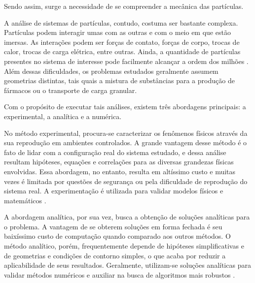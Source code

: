 

Sendo assim, surge a necessidade de se compreender a mecânica das partículas.

A análise de sistemas de partículas, contudo, costuma ser bastante complexa. Partículas podem interagir umas com as outras e com o meio em que estão imersas. As interações podem ser forças de contato, forças de corpo, trocas de calor, trocas de carga elétrica, entre outras. Ainda, a quantidade de partículas presentes no sistema de interesse pode facilmente alcançar a ordem dos milhões \cite{bib:computational_granular_dynamics}. Além dessas dificuldades, os problemas estudados geralmente assumem geometrias distintas, tais quais a mistura de substâncias para a produção de fármacos ou o transporte de carga granular.

Com o propósito de executar tais análises, existem três abordagens principais: a experimental, a analítica e a numérica. 

No método experimental, procura-se caracterizar os fenômenos físicos através da sua reprodução em ambientes controlados. A grande vantagem desse método é o fato de lidar com a configuração real do sistema estudado, e dessa análise resultam hipóteses, equações e correlações para as diversas grandezas físicas envolvidas. Essa abordagem, no entanto, resulta em altíssimo custo e muitas vezes é limitada por questões de segurança ou pela dificuldade de reprodução do sistema real. A experimentação é utilizada para validar modelos físicos e matemáticos \cite{bib:maliska}.

A abordagem analítica, por sua vez, busca a obtenção de soluções analíticas para o problema. A vantagem de se obterem soluções em forma fechada é seu baixíssimo custo de computação quando comparado aos outros métodos. O método analítico, porém, frequentemente depende de hipóteses simplificativas e de geometrias e condições de contorno simples, o que acaba por reduzir a aplicabilidade de seus resultados. Geralmente, utilizam-se soluções analíticas para validar métodos numéricos e auxiliar na busca de algoritmos mais robustos \cite{bib:maliska}.

